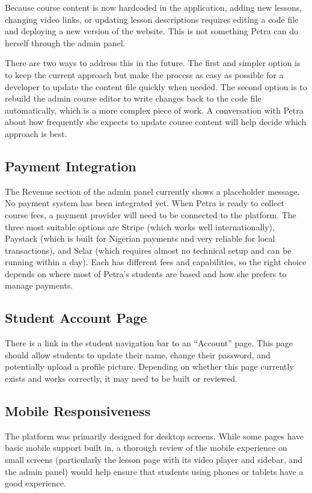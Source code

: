 \documentclass[12pt, a4paper]{article}
\begin{document}
Because course content is now hardcoded in the application, adding new lessons, changing video links, or updating lesson descriptions requires editing a code file and deploying a new version of the website. This is not something Petra can do herself through the admin panel.

There are two ways to address this in the future. The first and simpler option is to keep the current approach but make the process as easy as possible for a developer to update the content file quickly when needed. The second option is to rebuild the admin course editor to write changes back to the code file automatically, which is a more complex piece of work. A conversation with Petra about how frequently she expects to update course content will help decide which approach is best.

\subsection{Payment Integration}

The Revenue section of the admin panel currently shows a placeholder message. No payment system has been integrated yet. When Petra is ready to collect course fees, a payment provider will need to be connected to the platform. The three most suitable options are Stripe (which works well internationally), Paystack (which is built for Nigerian payments and very reliable for local transactions), and Selar (which requires almost no technical setup and can be running within a day). Each has different fees and capabilities, so the right choice depends on where most of Petra's students are based and how she prefers to manage payments.

\subsection{Student Account Page}

There is a link in the student navigation bar to an ``Account'' page. This page should allow students to update their name, change their password, and potentially upload a profile picture. Depending on whether this page currently exists and works correctly, it may need to be built or reviewed.

\subsection{Mobile Responsiveness}

The platform was primarily designed for desktop screens. While some pages have basic mobile support built in, a thorough review of the mobile experience on small screens (particularly the lesson page with its video player and sidebar, and the admin panel) would help ensure that students using phones or tablets have a good experience.
\end{document}

